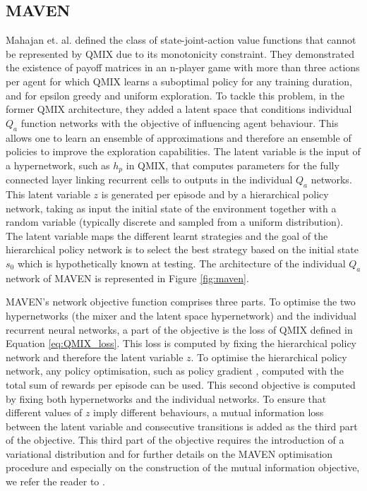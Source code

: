 \subsection{MAVEN}
Mahajan et. al. \cite{Mahajan2019MAVEN:Exploration} defined the class of state-joint-action value functions that cannot be represented by QMIX due to its monotonicity constraint.
They demonstrated the existence of payoff matrices in an n-player game with more than three actions per agent for which QMIX learns a suboptimal policy for any training duration, and for epsilon greedy and uniform exploration.
To tackle this problem, in the former QMIX architecture, they added a latent space that conditions individual $Q_a$ function networks with the objective of influencing agent behaviour.
This allows one to learn an ensemble of approximations and therefore an ensemble of policies to improve the exploration capabilities.
The latent variable is the input of a hypernetwork, such as $h_p$ in QMIX, that computes parameters for the fully connected layer linking recurrent cells to outputs in the individual $Q_a$ networks.
This latent variable $z$ is generated per episode and by a hierarchical policy network, taking as input the initial state of the environment together with a random variable (typically discrete and sampled from a uniform distribution).
The latent variable maps the different learnt strategies and the goal of the hierarchical policy network is to select the best strategy based on the initial state $s_0$ which is hypothetically known at testing.
The architecture of the individual $Q_a$ network of MAVEN is represented in Figure \ref{fig:maven}.

MAVEN's network objective function comprises three parts.
To optimise the two hypernetworks (the mixer and the latent space hypernetwork) and the individual recurrent neural networks, a part of the objective is the loss of QMIX defined in Equation \ref{eq:QMIX_loss}.
This loss is computed by fixing the hierarchical policy network and therefore the latent variable $z$.
To optimise the hierarchical policy network, any policy optimisation, such as policy gradient \citep{NIPS1999_464d828b}, computed with the total sum of rewards per episode can be used.
This second objective is computed by fixing both hypernetworks and the individual networks.
To ensure that different values of $z$ imply different behaviours, a mutual information loss between the latent variable and consecutive transitions is added as the third part of the objective.
This third part of the objective requires the introduction of a variational distribution and for further details on the MAVEN optimisation procedure and especially on the construction of the mutual information objective, we refer the reader to \cite{Mahajan2019MAVEN:Exploration}.

